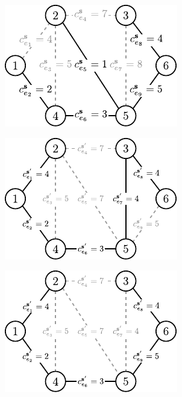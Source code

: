 \begin{figure}[!htbp]
	\null\hfill
	\begin{subfigure}[b]{0.3\textwidth}
		\includegraphics[width=\textwidth]{Chapter_II/INC-MST-example/a}
		\caption{}
		\label{fig:increxample:a}
	\end{subfigure}
	\hfill
	\begin{subfigure}[b]{0.3\textwidth}
		\includegraphics[width=\textwidth]{Chapter_II/INC-MST-example/b}
		\caption{}
		\label{fig:increxample:b}
	\end{subfigure}
	\hfill
	\begin{subfigure}[b]{0.3\textwidth}
		\includegraphics[width=\textwidth]{Chapter_II/INC-MST-example/c}

\end{subfigure}
\end{figure}
